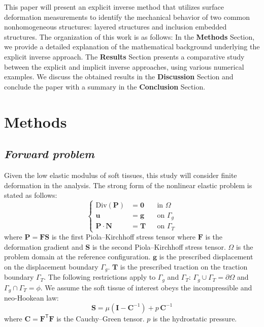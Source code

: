 \documentclass[11pt]{article}
\begin{document}
This paper will present an explicit inverse method that utilizes
surface deformation measurements to identify the mechanical behavior
of two common nonhomogeneous structures: layered structures and
inclusion embedded structures. The organization of this work is as
follows: In the \textbf{Methods} Section, we provide a detailed
explanation of the mathematical background underlying the explicit
inverse approach. The \textbf{Results} Section presents a comparative
study between the explicit and implicit inverse approaches, using
various numerical examples. We discuss the obtained results in the
\textbf{Discussion} Section and conclude the paper with a summary in
the \textbf{Conclusion} Section.

\section*{Methods}

\subsection*{\textit{Forward problem}}

\noindent
Given the low elastic modulus of soft tissues, this study will
consider finite deformation in the analysis. The strong form of the
nonlinear elastic problem is stated as follows:
\begin{equation}
\left\{
\begin{aligned}
\mathrm{Div}(\mathbf{P}) &= \mathbf{0} && \text{in } \Omega \\
\mathbf{u}               &= \mathbf{g} && \text{on } \Gamma_g \\
\mathbf{P}\cdot\mathbf{N} &= \mathbf{T} && \text{on } \Gamma_T
\end{aligned}
\right.
\end{equation}
where $\mathbf{P} = \mathbf{F}\mathbf{S}$ is the first
Piola--Kirchhoff stress tensor where $\mathbf{F}$ is the deformation
gradient and $\mathbf{S}$ is the second Piola--Kirchhoff stress
tensor. $\Omega$ is the problem domain at the reference
configuration. $\mathbf{g}$ is the prescribed displacement on the
displacement boundary $\Gamma_g$. $\mathbf{T}$ is the prescribed
traction on the traction boundary $\Gamma_T$. The following
restrictions apply to $\Gamma_g$ and $\Gamma_T$: $\Gamma_g \cup
\Gamma_T = \partial\Omega$ and $\Gamma_g \cap \Gamma_T = \phi$. We
assume the soft tissue of interest obeys the incompressible and
neo-Hookean law:
\begin{equation}
\mathbf{S} = \mu\!\left(\mathbf{I} - \mathbf{C}^{-1}\right)
             + p\,\mathbf{C}^{-1}
\end{equation}
where $\mathbf{C} = \mathbf{F}^{\mathsf{T}}\mathbf{F}$ is the
Cauchy--Green tensor. $p$ is the hydrostatic pressure.
\end{document}
